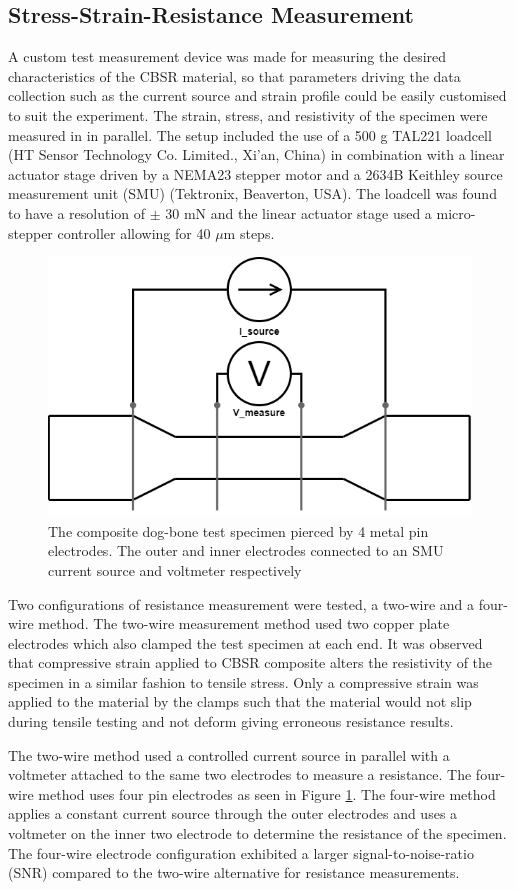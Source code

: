 
\subsection{Stress-Strain-Resistance Measurement}
A custom test measurement device was made for measuring the desired characteristics of the CBSR material, so that parameters driving the data collection such as the current source and strain profile could be easily customised to suit the experiment. The strain, stress, and resistivity of the specimen were measured in in parallel. The setup included the use of a 500 g TAL221 loadcell (HT Sensor Technology Co. Limited., Xi'an, China) in combination with a linear actuator stage driven by a NEMA23 stepper motor and a 2634B Keithley source measurement unit (SMU) (Tektronix, Beaverton, USA). The loadcell was found to have a resolution of $\pm$ 30 mN and the linear actuator stage used a micro-stepper controller allowing for 40 $\mu$m steps.
\begin{figure}[H]
	\centering
	\includegraphics[width=0.5\linewidth]{Figures/4wire_specimen.png}
	\caption{The composite dog-bone test specimen pierced by 4 metal pin electrodes. The outer and inner electrodes connected to an SMU current source and voltmeter respectively}
	\label{fig:four_wire_dogbone}
\end{figure}
Two configurations of resistance measurement were tested, a two-wire and a four-wire method. The two-wire measurement method used two copper plate electrodes which also clamped the test specimen at each end. It was observed that compressive strain applied to CBSR composite alters the resistivity of the specimen in a similar fashion to tensile stress. Only a compressive strain was applied to the material by the clamps such that the material would not slip during tensile testing and not deform giving erroneous resistance results.

The two-wire method used a controlled current source in parallel with a voltmeter attached to the same two electrodes to measure a resistance. The four-wire method uses four pin electrodes as seen in Figure \ref{fig:four_wire_dogbone}. The four-wire method applies a constant current source through the outer electrodes and uses a voltmeter on the inner two electrode to determine the resistance of the specimen. The four-wire electrode configuration exhibited a larger signal-to-noise-ratio (SNR) compared to the two-wire alternative for resistance measurements.

